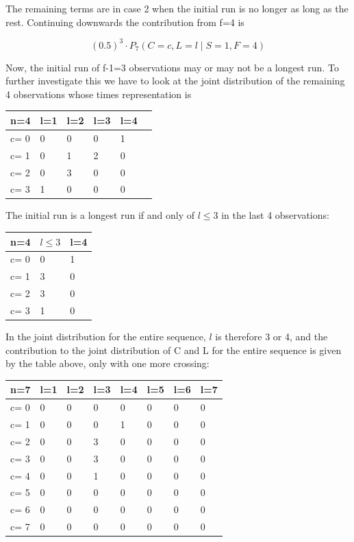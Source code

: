 The remaining terms are in case 2 when the initial run is no longer as long as the rest. Continuing downwards the contribution from f=4 is 

$$(0.5)^3 \cdot   P_7 (C=c, L=l \mid S=1,F=4)$$

Now, the initial run of f-1=3 observations may or may not be a longest run. To further investigate this we have to look at the joint distribution of the remaining 4 observations whose times representation is 

\begin{tabular}{l | l l l l l}
\hline
n=4&l=1&l=2&l=3&l=4\\
\hline
c= 0& 0& 0& 0& 1\\
c= 1& 0& 1& 2& 0\\
c= 2& 0& 3& 0& 0\\
c= 3& 1& 0& 0& 0\\
\hline
\end{tabular}

The initial run is a longest run if and only of $l \leq 3$ in the last 4 observations:

\begin{tabular}{l | l l}
\hline
n=4&$l \leq 3$&l=4\\
\hline
c= 0& 0& 1\\
c= 1& 3& 0\\
c= 2& 3& 0\\
c= 3& 1& 0\\
\hline
\end{tabular}

In the joint distribution for the entire sequence, $l$ is therefore 3 or 4, and the contribution to the joint distribution of C and L for the entire sequence is given by the table above, only with one more crossing:

\begin{tabular}{l | l l l l l l l}
\hline
n=7&l=1&l=2&l=3&l=4&l=5&l=6&l=7\\
\hline
c= 0& 0& 0& 0& 0& 0& 0& 0\\
c= 1& 0& 0& 0& 1& 0& 0& 0\\
c= 2& 0& 0& 3& 0& 0& 0& 0\\
c= 3& 0& 0& 3& 0& 0& 0& 0\\
c= 4& 0& 0& 1& 0& 0& 0& 0\\
c= 5& 0& 0& 0& 0& 0& 0& 0\\
c= 6& 0& 0& 0& 0& 0& 0& 0\\
c= 7& 0& 0& 0& 0& 0& 0& 0\\
\hline
\end{tabular}


